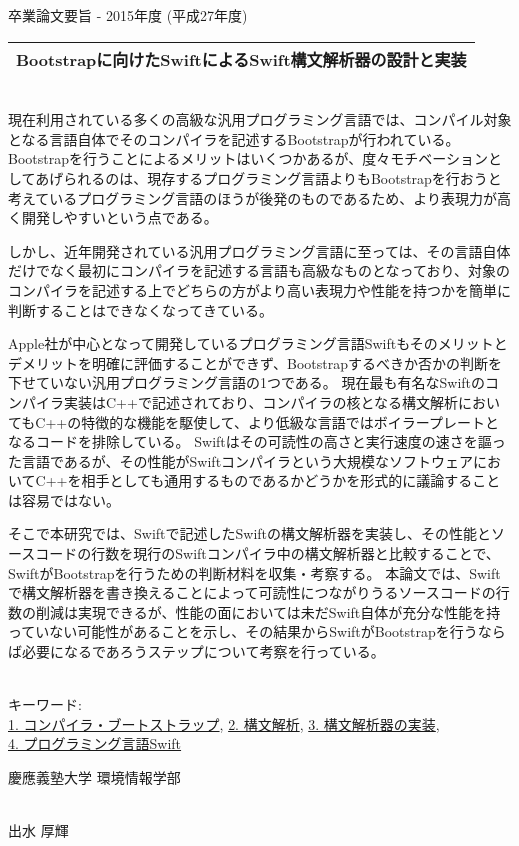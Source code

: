 卒業論文要旨 - 2015年度 (平成27年度)
~ \\
\begin{center}
\begin{Large}
\begin{tabular}{|c|} \hline
Bootstrapに向けたSwiftによるSwift構文解析器の設計と実装
\\ \hline
\end{tabular}
\end{Large}
\end{center}
~  \\

現在利用されている多くの高級な汎用プログラミング言語では、コンパイル対象となる言語自体でそのコンパイラを記述するBootstrapが行われている。
Bootstrapを行うことによるメリットはいくつかあるが、度々モチベーションとしてあげられるのは、現存するプログラミング言語よりもBootstrapを行おうと考えているプログラミング言語のほうが後発のものであるため、より表現力が高く開発しやすいという点である。

しかし、近年開発されている汎用プログラミング言語に至っては、その言語自体だけでなく最初にコンパイラを記述する言語も高級なものとなっており、対象のコンパイラを記述する上でどちらの方がより高い表現力や性能を持つかを簡単に判断することはできなくなってきている。

Apple社が中心となって開発しているプログラミング言語Swiftもそのメリットとデメリットを明確に評価することができず、Bootstrapするべきか否かの判断を下せていない汎用プログラミング言語の1つである。
現在最も有名なSwiftのコンパイラ実装はC++で記述されており、コンパイラの核となる構文解析においてもC++の特徴的な機能を駆使して、より低級な言語ではボイラープレートとなるコードを排除している。
Swiftはその可読性の高さと実行速度の速さを謳った言語であるが、その性能がSwiftコンパイラという大規模なソフトウェアにおいてC++を相手としても通用するものであるかどうかを形式的に議論することは容易ではない。

そこで本研究では、Swiftで記述したSwiftの構文解析器を実装し、その性能とソースコードの行数を現行のSwiftコンパイラ中の構文解析器と比較することで、SwiftがBootstrapを行うための判断材料を収集・考察する。
本論文では、Swiftで構文解析器を書き換えることによって可読性につながりうるソースコードの行数の削減は実現できるが、性能の面においては未だSwift自体が充分な性能を持っていない可能性があることを示し、その結果からSwiftがBootstrapを行うならば必要になるであろうステップについて考察を行っている。

~ \\
キーワード:\\
\underline{1. コンパイラ・ブートストラップ},
\underline{2. 構文解析},
\underline{3. 構文解析器の実装},\\
\underline{4. プログラミング言語Swift}
\begin{flushright}
慶應義塾大学 環境情報学部\\
~ \\
\begin{Large}
出水 厚輝
\end{Large}
\end{flushright}
